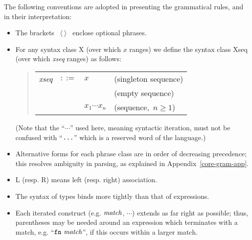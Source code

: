 The following conventions are adopted in presenting the grammatical rules,
and in their interpretation:
\begin{itemize}
  \item The brackets ~$\langle\ \rangle$~ enclose optional phrases.
  \item For any syntax class X (over which $x$ ranges)
we define the syntax class Xseq (over which {\it xseq} ranges) as follows:
    \begin{quote}
    \begin{tabular}{rcll}
       {\it xseq} & $::=$ & $x$ & (singleton sequence)\\
                  &       &     & (empty sequence)\\
                  &       & \ml{(}$x_1$\ml{,}$\cdots$\ml{,}$x_n$\ml{)}
                                & (sequence,~$n\geq 1$) \\
    \end{tabular}
    \end{quote}
(Note that the ``$\cdots$'' used here, meaning syntactic iteration, must not be
confused with ``$\mbox{{\tt ...}}$'' which is a reserved word of the language.)
  \item Alternative forms for each phrase class are in order of decreasing
        precedence; this resolves ambiguity in parsing, as explained
        in Appendix~\ref{core-gram-app}.
  \item L (resp. R) means left (resp. right) association.

\item The syntax of types binds more tightly than that of expressions.

\item Each iterated construct (e.g. ${\it match}$, $\cdots$)
extends as far
right as possible; thus, parentheses may be needed around an expression which
terminates with a match, e.g. ``${\tt fn}\ {\it match}$'', if this occurs within a
larger
match.
\end{itemize}



